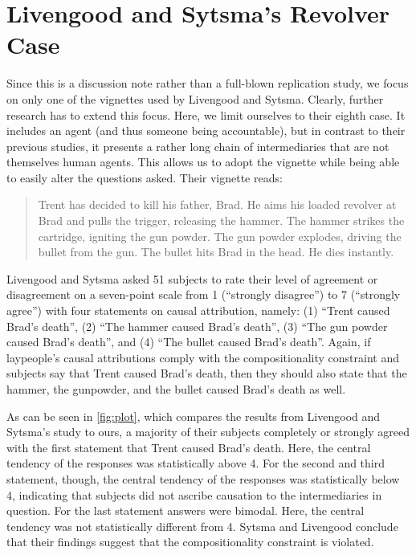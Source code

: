 \documentclass[12pt]{scrartcl}
\begin{document}
\section{Livengood and Sytsma's Revolver Case}
Since this is a discussion note rather than a full-blown replication study, we focus on only one of the vignettes used by Livengood and Sytsma. Clearly, further research has to extend this focus. Here, we limit ourselves to their eighth case. It includes an agent (and thus someone being accountable), but in contrast to their previous studies, it presents a rather long chain of intermediaries that are not themselves human agents. This allows us to adopt the vignette while being able to easily alter the questions asked. Their vignette \citep[59]{livengood_actual_2020} reads:
%
\begin{quote}
   \small Trent has decided to kill his father, Brad. He aims his loaded revolver at Brad and pulls the trigger, releasing the hammer. The hammer strikes the cartridge, igniting the gun powder. The gun powder explodes, driving the bullet from the gun. The bullet hits Brad in the head. He dies instantly.
\end{quote}
%
Livengood and Sytsma asked 51 subjects to rate their level of agreement or disagreement on a seven-point scale from 1 (\enquote{strongly disagree}) to 7 (\enquote{strongly agree}) with four statements on causal attribution, namely: (1) \enquote{Trent caused Brad's death}, (2) \enquote{The hammer caused Brad's death}, (3) \enquote{The gun powder caused Brad's death}, and (4) \enquote{The bullet caused Brad's death}. Again, if laypeople's causal attributions comply with the compositionality constraint and subjects say that Trent caused Brad's death, then they should also state that the hammer, the gunpowder, and the bullet caused Brad's death as well.

As can be seen in \autoref{fig:plot}, which compares the results from Livengood and Sytsma's study to ours, a  majority of their subjects completely or strongly agreed with the first statement that Trent caused Brad's death. Here, the central tendency of the responses was statistically above 4. For the second and third statement, though, the central tendency of the responses was statistically below 4, indicating that subjects did not ascribe causation to the intermediaries in question. For the last statement answers were bimodal. Here, the central tendency was not statistically different from 4. Sytsma and Livengood conclude that their findings suggest that the compositionality constraint is violated.
\end{document}
